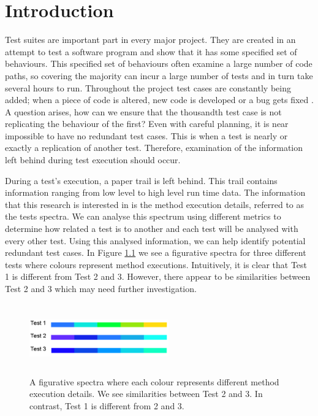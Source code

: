 \chapter{Introduction}\label{C:intro}

Test suites are important part in every major project. They are created in an attempt to test a software program and show that it has some specified set of behaviours. This specified set of behaviours often examine a large number of code paths, so covering the majority can incur a large number of tests and in turn take several hours to run. Throughout the project test cases are constantly being added; when a piece of code is altered, new code is developed or a bug gets fixed \cite{issuetrack,whentotest}. A question arises, how can we ensure that the thousandth test case is not replicating the behaviour of the first? Even with careful planning, it is near impossible to have no redundant test cases. This is when a test is nearly or exactly a replication of another test. Therefore, examination of the information left behind during test execution should occur. 

During a test's execution, a paper trail is left behind. This trail contains information ranging from low level to high level run time data. The information that this research is interested in is the method execution details, referred to as the tests spectra. We can analyse this spectrum using different metrics to determine how related a test is to another and each test will be analysed with every other test. Using this analysed information, we can help identify potential redundant test cases. In Figure \ref{fig:spectra} we see a figurative spectra for three different tests where colours represent method executions. Intuitively, it is clear that Test 1 is different from Test 2 and 3. However, there appear to be similarities between Test 2 and 3 which may need further investigation.

\begin{figure}[h]
\centering
\includegraphics[width=6cm,height=3cm]{spectra.png}
\caption{A figurative spectra where each colour represents different method execution details. We see similarities between Test 2 and 3. In contrast, Test 1 is different from 2 and 3. }
\label{fig:spectra}
\end{figure}

